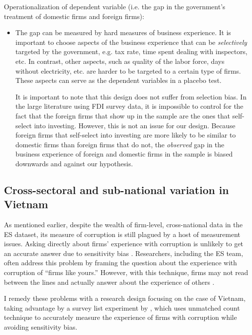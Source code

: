 Operationalization of dependent variable (i.e. the gap in the government's treatment of domestic firms and foreign firms):
\begin{itemize}
\item The gap can be measured by hard measures of business experience. It is important to choose aspects of the business experience that can be \textit{selectively} targeted by the government, e.g. tax rate, time spent dealing with inspectors, etc. In contrast, other aspects, such as quality of the labor force, days without electricity, etc. are harder to be targeted to a certain type of firms. These aspects can serve as the dependent variables in a placebo test.

It is important to note that this design does not suffer from selection bias. In the large literature using FDI survey data, it is impossible to control for the fact that the foreign firms that show up in the sample are the ones that self-select into investing. However, this is not an issue for our design. Because foreign firms that self-select into investing are more likely to be similar to domestic firms than foreign firms that do not, the \textit{observed} gap in the business experience of foreign and domestic firms in the sample is biased downwards and against our hypothesis.
\end{itemize}

\subsection{Cross-sectoral and sub-national variation in Vietnam}

As mentioned earlier, despite the wealth of firm-level, cross-national data in the ES dataset, its measure of corruption is still plagued by a host of measurement issues. Asking directly about firms' experience with corruption is unlikely to get an accurate answer due to sensitivity bias \citep{Coutts2011}. Researchers, including the ES team, often address this problem by framing the question about the experience with corruption of ``firms like yours.'' However, with this technique, firms may not read between the lines and actually answer about the experience of others \citep{Ahart2004}.

I remedy these problems with a research design focusing on the case of Vietnam, taking advantage by a survey list experiment by \citet{Malesky2015}, which uses unmatched count technique to accurately measure the experience of firms with corruption while avoiding sensitivity bias.

